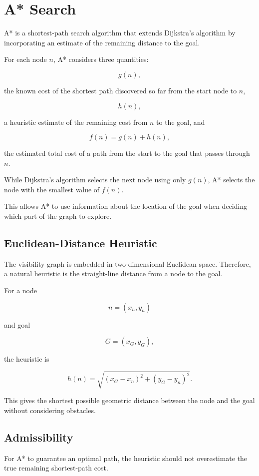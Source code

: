 \section{A* Search}

A* is a shortest-path search algorithm that extends Dijkstra's algorithm
by incorporating an estimate of the remaining distance to the goal.

For each node $n$, A* considers three quantities:

\[
g(n),
\]

the known cost of the shortest path discovered so far from the start node
to $n$,

\[
h(n),
\]

a heuristic estimate of the remaining cost from $n$ to the goal, and

\[
f(n)=g(n)+h(n),
\]

the estimated total cost of a path from the start to the goal that passes
through $n$.

While Dijkstra's algorithm selects the next node using only $g(n)$, A*
selects the node with the smallest value of $f(n)$.

This allows A* to use information about the location of the goal when
deciding which part of the graph to explore.

\subsection{Euclidean-Distance Heuristic}

The visibility graph is embedded in two-dimensional Euclidean space.
Therefore, a natural heuristic is the straight-line distance from a node
to the goal.

For a node

\[
n=(x_n,y_n)
\]

and goal

\[
G=(x_G,y_G),
\]

the heuristic is

\[
h(n)
=
\sqrt{
(x_G-x_n)^2
+
(y_G-y_n)^2
}.
\]

This gives the shortest possible geometric distance between the node and
the goal without considering obstacles.

\subsection{Admissibility}

For A* to guarantee an optimal path, the heuristic should not overestimate
the true remaining shortest-path cost.

